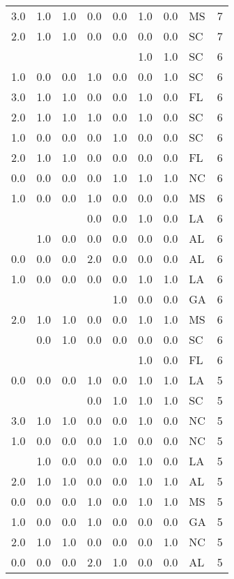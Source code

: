 \begin{tabular}{llllllllr}
3.0 & 1.0 & 1.0 & 0.0 & 0.0 & 1.0 & 0.0 & MS &     7 \\
2.0 & 1.0 & 1.0 & 0.0 & 0.0 & 0.0 & 0.0 & SC &     7 \\
    &     &     &     &     & 1.0 & 1.0 & SC &     6 \\
1.0 & 0.0 & 0.0 & 1.0 & 0.0 & 0.0 & 1.0 & SC &     6 \\
3.0 & 1.0 & 1.0 & 0.0 & 0.0 & 1.0 & 0.0 & FL &     6 \\
2.0 & 1.0 & 1.0 & 1.0 & 0.0 & 1.0 & 0.0 & SC &     6 \\
1.0 & 0.0 & 0.0 & 0.0 & 1.0 & 0.0 & 0.0 & SC &     6 \\
2.0 & 1.0 & 1.0 & 0.0 & 0.0 & 0.0 & 0.0 & FL &     6 \\
0.0 & 0.0 & 0.0 & 0.0 & 1.0 & 1.0 & 1.0 & NC &     6 \\
1.0 & 0.0 & 0.0 & 1.0 & 0.0 & 0.0 & 0.0 & MS &     6 \\
    &     &     & 0.0 & 0.0 & 1.0 & 0.0 & LA &     6 \\
    & 1.0 & 0.0 & 0.0 & 0.0 & 0.0 & 0.0 & AL &     6 \\
0.0 & 0.0 & 0.0 & 2.0 & 0.0 & 0.0 & 0.0 & AL &     6 \\
1.0 & 0.0 & 0.0 & 0.0 & 0.0 & 1.0 & 1.0 & LA &     6 \\
    &     &     &     & 1.0 & 0.0 & 0.0 & GA &     6 \\
2.0 & 1.0 & 1.0 & 0.0 & 0.0 & 1.0 & 1.0 & MS &     6 \\
    & 0.0 & 1.0 & 0.0 & 0.0 & 0.0 & 0.0 & SC &     6 \\
    &     &     &     &     & 1.0 & 0.0 & FL &     6 \\
0.0 & 0.0 & 0.0 & 1.0 & 0.0 & 1.0 & 1.0 & LA &     5 \\
    &     &     & 0.0 & 1.0 & 1.0 & 1.0 & SC &     5 \\
3.0 & 1.0 & 1.0 & 0.0 & 0.0 & 1.0 & 0.0 & NC &     5 \\
1.0 & 0.0 & 0.0 & 0.0 & 1.0 & 0.0 & 0.0 & NC &     5 \\
    & 1.0 & 0.0 & 0.0 & 0.0 & 1.0 & 0.0 & LA &     5 \\
2.0 & 1.0 & 1.0 & 0.0 & 0.0 & 1.0 & 1.0 & AL &     5 \\
0.0 & 0.0 & 0.0 & 1.0 & 0.0 & 1.0 & 1.0 & MS &     5 \\
1.0 & 0.0 & 0.0 & 1.0 & 0.0 & 0.0 & 0.0 & GA &     5 \\
2.0 & 1.0 & 1.0 & 0.0 & 0.0 & 0.0 & 1.0 & NC &     5 \\
0.0 & 0.0 & 0.0 & 2.0 & 1.0 & 0.0 & 0.0 & AL &     5 \\

\end{tabular}
